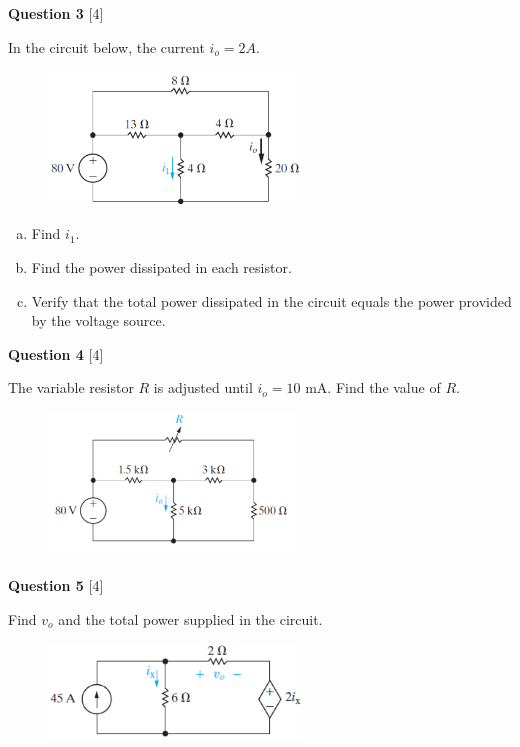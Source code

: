 \documentclass[12pt]{article}
\begin{document}
\newpage
{\bf Question 3} [4] %

In the circuit below, the current $i_{o} = 2A$.  
\begin{figure}[h!]
     \centering
\vspace{-0.1in}
     \includegraphics[clip,width=0.6\textwidth]{Fig2-22.png}
\vspace{-0.15in}
\end{figure}

\begin{enumerate}[(a)]
\item Find $i_1$.
\item Find the power dissipated in each resistor.
\item Verify that the total power dissipated in the circuit equals the power provided by the voltage source.
\end{enumerate}

{\bf Question 4} [4] %

The variable resistor $R$ is adjusted until $i_{o} = 10$ mA. Find the value of $R$.
\begin{figure}[!h]
  \centering 
  \includegraphics[clip,width=0.6\textwidth]{Fig2-27.png}
\end{figure}

{\bf Question 5} [4] %

Find $v_{o}$ and the total power supplied in the circuit.
\begin{figure}[h!]
\centering 
\includegraphics[clip,width=0.6\textwidth]{Fig2-34.png}
\end{figure}
\end{document}
